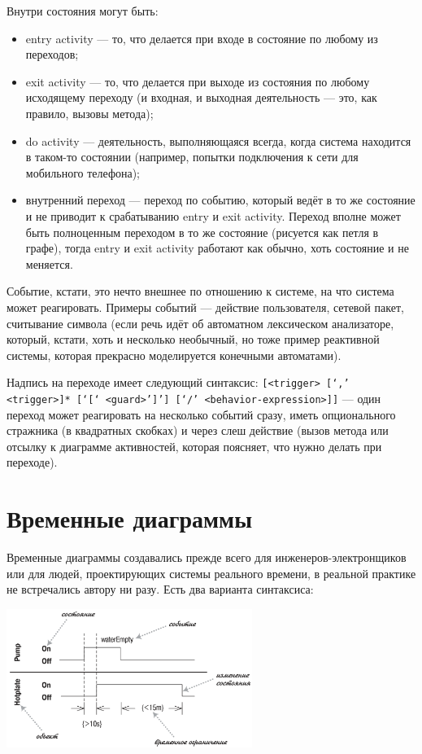 \documentclass{../mcstext}
\begin{document}
Внутри состояния могут быть:

\begin{itemize}
    \item entry activity --- то, что делается при входе в состояние по любому из переходов;
    \item exit activity --- то, что делается при выходе из состояния по любому исходящему переходу (и входная, и выходная деятельность --- это, как правило, вызовы метода);
    \item do activity --- деятельность, выполняющаяся всегда, когда система находится в таком-то состоянии (например, попытки подключения к сети для мобильного телефона);
    \item внутренний переход --- переход по событию, который ведёт в то же состояние и не приводит к срабатыванию entry и exit activity. Переход вполне может быть полноценным переходом в то же состояние (рисуется как петля в графе), тогда entry и exit activity работают как обычно, хоть состояние и не меняется.
\end{itemize}

Событие, кстати, это нечто внешнее по отношению к системе, на что система может реагировать. Примеры событий --- действие пользователя, сетевой пакет, считывание символа (если речь идёт об автоматном лексическом анализаторе, который, кстати, хоть и несколько необычный, но тоже пример реактивной системы, которая прекрасно моделируется конечными автоматами).

Надпись на переходе имеет следующий синтаксис: \verb|[<trigger> [‘,’ <trigger>]* [‘[‘ <guard>’]’] [‘/’ <behavior-expression>]]| --- один переход может реагировать на несколько событий сразу, иметь опционального стражника (в квадратных скобках) и через слеш действие (вызов метода или отсылку к диаграмме активностей, которая поясняет, что нужно делать при переходе).

\section{Временные диаграммы}

Временные диаграммы создавались прежде всего для инженеров-электронщиков или для людей, проектирующих системы реального времени, в реальной практике не встречались автору ни разу. Есть два варианта синтаксиса:

\begin{center}
    \includegraphics[width=0.6\textwidth]{timingDiagrams.png}
\end{center}
\end{document}
